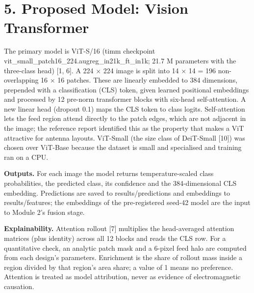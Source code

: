 \documentclass[11pt,a4paper]{article}
\begin{document}
\section*{5. Proposed Model: Vision Transformer}
The primary model is ViT-S/16 (timm checkpoint vit\_small\_patch16\_224.augreg\_in21k\_ft\_in1k; 21.7 M parameters with the three-class head) [1, 6]. A 224 $\times$ 224 image is split into 14 $\times$ 14 = 196 non-overlapping 16 $\times$ 16 patches. These are linearly embedded to 384 dimensions, prepended with a classification (CLS) token, given learned positional embeddings and processed by 12 pre-norm transformer blocks with six-head self-attention. A new linear head (dropout 0.1) maps the CLS token to class logits. Self-attention lets the feed region attend directly to the patch edges, which are not adjacent in the image; the reference report identified this as the property that makes a ViT attractive for antenna layouts. ViT-Small (the size class of DeiT-Small [10]) was chosen over ViT-Base because the dataset is small and specialised and training ran on a CPU.

\textbf{Outputs.} For each image the model returns temperature-scaled class probabilities, the predicted class, its confidence and the 384-dimensional CLS embedding. Predictions are saved to results/predictions and embeddings to results/features; the embeddings of the pre-registered seed-42 model are the input to Module 2's fusion stage.

\textbf{Explainability.} Attention rollout [7] multiplies the head-averaged attention matrices (plus identity) across all 12 blocks and reads the CLS row. For a quantitative check, an analytic patch mask and a 6-pixel feed halo are computed from each design's parameters. Enrichment is the share of rollout mass inside a region divided by that region's area share; a value of 1 means no preference. Attention is treated as model attribution, never as evidence of electromagnetic causation.
\end{document}
